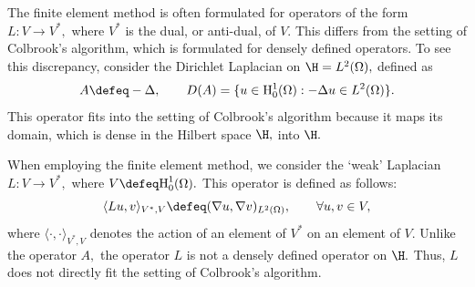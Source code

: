The finite element method is often formulated for operators of the form $L : V \rightarrow V^*,$ where $V^*$ is the dual, or anti-dual, of $V.$ This differs from the setting of Colbrook's algorithm, which is formulated for densely defined operators. 
To see this discrepancy, consider the Dirichlet Laplacian on $\H = L^2(\Omega),$ defined as
\begin{equation} \label{weak L}
    A \defeq -\Delta, \qquad D(A) = \{u \in \mathrm{H}_0^1(\Omega) : -\Delta u \in L^2(\Omega)\}.
\end{equation}
This operator fits into the setting of Colbrook's algorithm because it maps its domain,  which is dense in the Hilbert space $\H,$ into $\H.$ 

 
When employing the finite element method, we consider the `weak' Laplacian $L : V \rightarrow V^*,$ where $V \defeq \text{H}_0^1(\Omega).$ This operator is defined as follows:
\begin{equation}
    \langle Lu, v \rangle_{V^*, V} \defeq (\nabla u, \nabla v)_{L^2(\Omega)}, \qquad \forall u, v \in V,
\end{equation}
where $\langle \cdot, \cdot \rangle_{V^*, V}$ denotes the action of an element of $V^*$ on an element of $V.$ Unlike the operator $A,$ the operator $L$ is not a densely defined operator on $\H.$ Thus, $L$ does not directly fit the setting of Colbrook's algorithm. 



